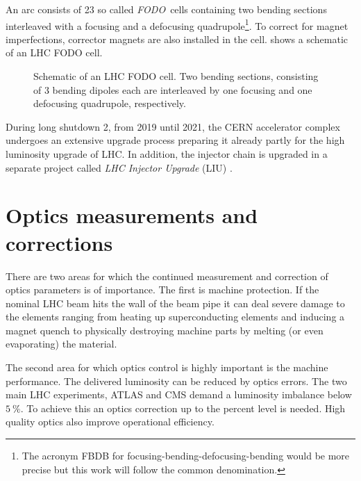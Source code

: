 An arc consists of 23 so called \emph{FODO}~cells containing two bending sections interleaved with
a focusing and a defocusing quadrupole\footnote{
    The acronym FBDB for focusing-bending-defocusing-bending would be more precise but this work will follow
    the common denomination.
}.
To correct for magnet imperfections, corrector magnets are also installed in the cell.
 shows a schematic of an LHC FODO cell.
%
\begin{figure}[ht]
    \centering
     
    \caption{
        Schematic of an LHC FODO cell. Two bending sections, consisting of 3 bending dipoles each
        are interleaved by one focusing and one defocusing quadrupole, respectively.
    }
    \label{fig_fodo}
\end{figure}
%
During long shutdown 2, from 2019 until 2021, the CERN accelerator complex undergoes an extensive upgrade process 
preparing it already partly for the high luminosity upgrade of LHC.
In addition, the injector chain is upgraded in a separate project called \emph{LHC Injector Upgrade} (LIU) \cite{Hanke2017,Bartosik2017}.

\section{Optics measurements and corrections}

There are two areas for which the continued measurement and correction of optics parameters is of
importance. The first is machine protection. If the nominal LHC beam hits the wall of the beam pipe
it can deal severe damage to the elements ranging from heating up superconducting elements and
inducing a magnet quench to physically destroying machine parts by melting (or even evaporating) the
material.

The second area for which  optics control is highly important is the machine performance.
The delivered luminosity can be reduced by optics errors.
The two main LHC experiments, ATLAS and CMS demand a luminosity imbalance below $\SI{5}{\percent}$.
To achieve this an optics correction up to the percent level is needed.
High quality optics also improve operational efficiency.

